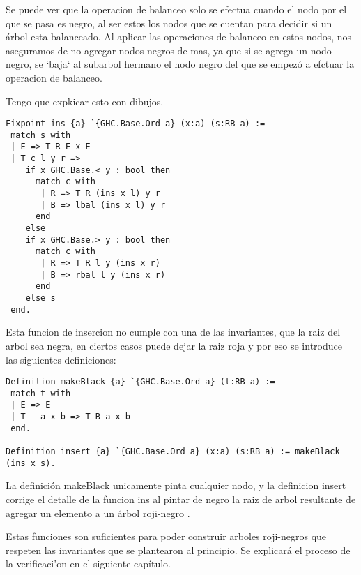 \documentclass[letterpaper,12pt,oneside]{book}
\newcommand{\arn}{árbol roji-negro }
\newcommand{\arns}{arboles roji-negros }
\begin{document}
Se puede ver que la operacion de balanceo solo se efectua cuando el nodo por el que se pasa es negro, al ser estos los nodos que se cuentan para decidir si un \'arbol
esta balanceado. Al aplicar las operaciones de balanceo en estos nodos, nos aseguramos de no agregar nodos negros de mas, ya que si se agrega un nodo negro, se `baja` al subarbol hermano
el nodo negro del que se empez\'o a efctuar la operacion de balanceo. 

Tengo que expkicar esto con dibujos.
\begin{verbatim}
Fixpoint ins {a} `{GHC.Base.Ord a} (x:a) (s:RB a) :=
 match s with
 | E => T R E x E
 | T c l y r =>
    if x GHC.Base.< y : bool then 
      match c with
       | R => T R (ins x l) y r
       | B => lbal (ins x l) y r
      end
    else 
    if x GHC.Base.> y : bool then 
      match c with
       | R => T R l y (ins x r)
       | B => rbal l y (ins x r)
      end
    else s
 end.
\end{verbatim}

Esta funcion de insercion no cumple con una de las invariantes, que la raiz del arbol sea negra, en ciertos casos puede dejar la raiz roja y por eso se introduce las siguientes definiciones:

\begin{verbatim}
Definition makeBlack {a} `{GHC.Base.Ord a} (t:RB a) :=
 match t with
 | E => E
 | T _ a x b => T B a x b
 end.

Definition insert {a} `{GHC.Base.Ord a} (x:a) (s:RB a) := makeBlack (ins x s).
\end{verbatim}

La definici\'on makeBlack unicamente pinta cualquier nodo, y la definicion insert corrige el detalle de la funcion ins al pintar de negro la raiz de arbol resultante de 
agregar un elemento a un \arn.

Estas funciones son suficientes para poder construir \arns que respeten las invariantes que se plantearon al principio. Se explicar\'a el proceso de la verificaci'on en el siguiente cap\'itulo.
\end{document}
